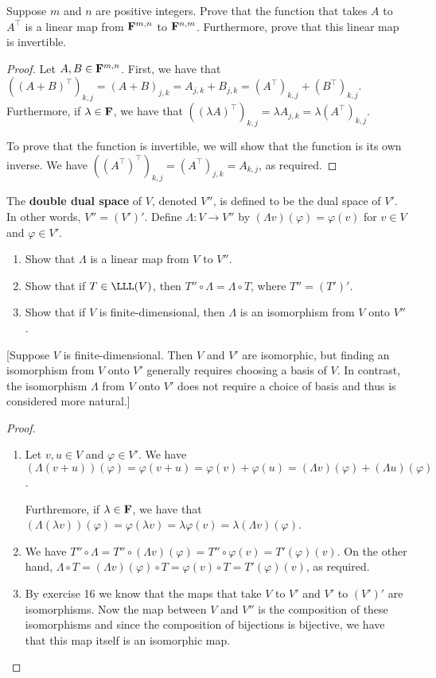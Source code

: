 \begin{exercise}{33}
Suppose $m$ and $n$ are positive integers. Prove that the function that takes $A$ to $A^\top$ is a linear map from $\mathbf{F}^{m,n}$ to $\mathbf{F}^{n,m}$. Furthermore, prove that this linear map is invertible.
\end{exercise}
\begin{proof}
 Let $A,B\in\mathbf{F}^{m,n}$. First, we have that $((A+B)^\top)_{k,j}= (A+B)_{j,k}= A_{j,k}+B_{j,k}= (A^\top)_{k,j}+(B^\top)_{k,j}$. Furthermore, if $\lambda\in\mathbf{F}$, we have that $((\lambda A)^\top)_{k,j}= \lambda A_{j,k}= \lambda (A^\top)_{k,j}$.

 To prove that the function is invertible, we will show that the function is its own inverse. We have $((A^\top)^\top)_{k,j}= (A^\top)_{j,k}= A_{k,j}$, as required.
\end{proof}

\begin{exercise}{34}
 The \textbf{double dual space} of $V$, denoted $V''$, is defined to be the dual space of $V'$. In other words, $V''=(V')'$. Define $\Lambda:V\rightarrow V''$ by $(\Lambda v)(\varphi)=\varphi(v)$ for $v\in V$ and $\varphi\in V'$.
 \begin{enumerate}
     \item Show that $\Lambda$ is a linear map from $V$ to $V''$.
     \item Show that if $T\in\LLL(V)$, then $T''\circ\Lambda=\Lambda\circ T$, where $T''=(T')'$.
     \item Show that if $V$ is finite-dimensional, then $\Lambda$ is an isomorphism from $V$ onto $V''$.
 \end{enumerate}
 [Suppose $V$ is finite-dimensional. Then $V$ and $V'$ are isomorphic, but finding an isomorphism from $V$ onto $V'$ generally requires choosing a basis of $V$. In contrast, the isomorphism $\Lambda$ from $V$ onto $V'$ does not require a choice of basis and thus is considered more natural.]
\end{exercise}
\begin{proof}
 \begin{enumerate}
     \item Let $v,u\in V$ and $\varphi\in V'$. We have $(\Lambda(v+u))(\varphi)=\varphi(v+u)=\varphi(v)+\varphi(u)=(\Lambda v)(\varphi)+(\Lambda u)(\varphi)$.

     Furthremore, if $\lambda\in\mathbf{F}$, we have that $(\Lambda(\lambda v))(\varphi)=\varphi(\lambda v)=\lambda\varphi(v)=\lambda(\Lambda v)(\varphi)$.
     \item We have $T''\circ\Lambda= T''\circ(\Lambda v)(\varphi)= T''\circ\varphi(v)= T'(\varphi)(v)$. On the other hand, $\Lambda\circ T= (\Lambda v)(\varphi)\circ T= \varphi(v)\circ T= T'(\varphi)(v)$, as required.
     \item By exercise 16 we know that the maps that take $V$ to $V'$ and $V'$ to $(V')'$ are isomorphisms. Now the map between $V$ and $V''$ is the composition of these isomorphisms and since the composition of bijections is bijective, we have that this map itself is an isomorphic map. 
 \end{enumerate}
\end{proof}